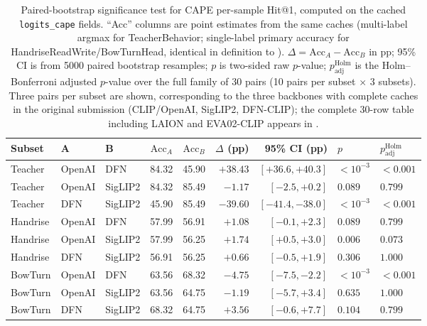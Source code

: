 \documentclass[symmetry,article,submit,pdftex,moreauthors]{Definitions/mdpi}
\begin{document}
\begin{table}[H]
\caption{Paired-bootstrap significance test for CAPE per-sample Hit@1, computed on the cached \texttt{logits\_cape} fields. ``Acc'' columns are point estimates from the same caches (multi-label argmax for TeacherBehavior; single-label primary accuracy for HandriseReadWrite/BowTurnHead, identical in definition to ). $\Delta=\text{Acc}_A-\text{Acc}_B$ in pp; 95\% CI is from 5000 paired bootstrap resamples; $p$ is two-sided raw $p$-value; $p_{\text{adj}}^{\text{Holm}}$ is the Holm--Bonferroni adjusted $p$-value over the full family of 30 pairs (10 pairs per subset $\times$ 3 subsets). Three pairs per subset are shown, corresponding to the three backbones with complete caches in the original submission (CLIP/OpenAI, SigLIP2, DFN-CLIP); the complete 30-row table including LAION and EVA02-CLIP appears in .}
\label{tab:paired_bootstrap}
\centering
\small
\setlength{\tabcolsep}{4pt}
\begin{tabular}{l ll cc r r l l}
\toprule
\textbf{Subset} & \textbf{A} & \textbf{B} & $\text{Acc}_A$ & $\text{Acc}_B$ & $\Delta$ (pp) & 95\% CI (pp) & $p$ & $p_{\text{adj}}^{\text{Holm}}$ \\
\midrule
Teacher  & OpenAI  & DFN     & 84.32 & 45.90 & $+38.43$ & $[+36.6,+40.3]$ & $<10^{-3}$ & $<0.001$ \\
Teacher  & OpenAI  & SigLIP2 & 84.32 & 85.49 & $-1.17$  & $[-2.5,+0.2]$    & $0.089$    & $0.799$ \\
Teacher  & DFN     & SigLIP2 & 45.90 & 85.49 & $-39.60$ & $[-41.4,-38.0]$ & $<10^{-3}$ & $<0.001$ \\
\midrule
Handrise & OpenAI  & DFN     & 57.99 & 56.91 & $+1.08$  & $[-0.1,+2.3]$    & $0.089$    & $0.799$ \\
Handrise & OpenAI  & SigLIP2 & 57.99 & 56.25 & $+1.74$  & $[+0.5,+3.0]$    & $0.006$    & $0.073$ \\
Handrise & DFN     & SigLIP2 & 56.91 & 56.25 & $+0.66$  & $[-0.5,+1.9]$    & $0.306$    & $1.000$ \\
\midrule
BowTurn  & OpenAI  & DFN     & 63.56 & 68.32 & $-4.75$  & $[-7.5,-2.2]$    & $<10^{-3}$ & $<0.001$ \\
BowTurn  & OpenAI  & SigLIP2 & 63.56 & 64.75 & $-1.19$  & $[-5.7,+3.4]$    & $0.635$    & $1.000$ \\
BowTurn  & DFN     & SigLIP2 & 68.32 & 64.75 & $+3.56$  & $[-0.6,+7.7]$    & $0.104$    & $0.799$ \\
\bottomrule
\end{tabular}
\end{table}
\end{document}
